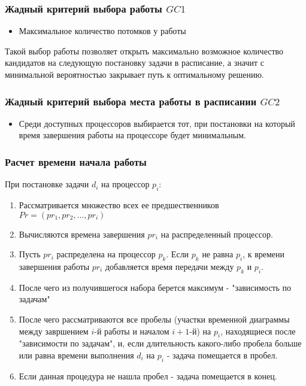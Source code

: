 \subsubsection{Жадный критерий выбора работы $GC1$}
\begin{itemize}
    \item Максимальное количество потомков у работы
\end{itemize}
Такой выбор работы позволяет открыть максимально возможное количество кандидатов на следующую постановку задачи в расписание, а значит с минимальной вероятностью закрывает путь к оптимальному решению.
\subsubsection{Жадный критерий выбора места работы в расписании $GC2$} \label{sec:get_crit}
\begin{itemize}
    \item Среди доступных процессоров выбирается тот, при постановки на который время завершения работы на процессоре будет минимальным.
\end{itemize}
\subsubsection{Расчет времени начала работы} \label{sec:gap_filling}
При постановке задачи $d_i$ на процессор $p_i$:
\begin{enumerate}
    \item Рассматривается множество всех ее предшественников $Pr = \left( pr_1, pr_2, \ldots, pr_i \right)$
    \item Вычисляются времена завершения $pr_i$ на распределенный процессор.
    \item Пусть $pr_i$ распределена на процессор $p_k$. Если $p_k$ не равна $p_i$, к времени завершения работы $pr_i$ добавляется время передачи между $p_k$ и $p_i$. 
    \item После чего из получившегося набора берется максимум - "зависимость по задачам"
    \item После чего рассматриваются все пробелы (участки временной диаграммы между завршением $i$-й работы и началом $i+1$-й) на $p_i$, находящиеся после "зависимости по задачам", и, если длительность какого-либо пробела больше или равна времени выполнения $d_i$ на $p_i$ - задача помещается в пробел.
    \item Если данная процедура не нашла пробел - задача помещается в конец.
\end{enumerate}

